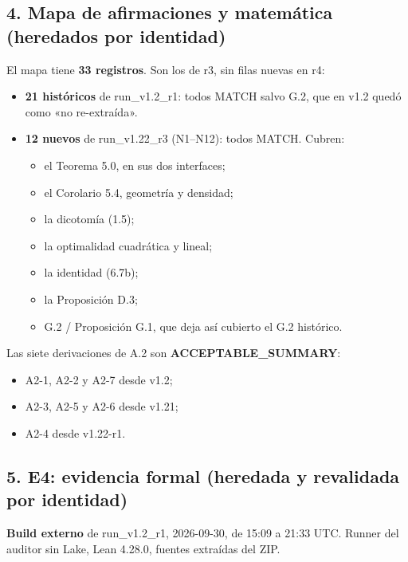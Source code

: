\documentclass[
]{article}
\providecommand{\tightlist}{%
  \setlength{\itemsep}{0pt}\setlength{\parskip}{0pt}}
\begin{document}
\subsection{4. Mapa de afirmaciones y matemática (heredados por
identidad)}\label{4-mapa-de-afirmaciones-y-matemuxe1tica-heredados-por-identidad}

El mapa tiene \textbf{33 registros}. Son los de r3, sin filas nuevas en
r4:

\begin{itemize}
\tightlist
\item
  \textbf{21 históricos} de run\_v1.2\_r1: todos MATCH salvo G.2, que en
  v1.2 quedó como «no re-extraída».
\item
  \textbf{12 nuevos} de run\_v1.22\_r3 (N1--N12): todos MATCH. Cubren:

  \begin{itemize}
  \tightlist
  \item
    el Teorema 5.0, en sus dos interfaces;
  \item
    el Corolario 5.4, geometría y densidad;
  \item
    la dicotomía (1.5);
  \item
    la optimalidad cuadrática y lineal;
  \item
    la identidad (6.7b);
  \item
    la Proposición D.3;
  \item
    G.2 / Proposición G.1, que deja así cubierto el G.2 histórico.
  \end{itemize}
\end{itemize}

Las siete derivaciones de A.2 son \textbf{ACCEPTABLE\_SUMMARY}:

\begin{itemize}
\tightlist
\item
  A2-1, A2-2 y A2-7 desde v1.2;
\item
  A2-3, A2-5 y A2-6 desde v1.21;
\item
  A2-4 desde v1.22-r1.
\end{itemize}

\subsection{5. E4: evidencia formal (heredada y revalidada por
identidad)}\label{5-e4-evidencia-formal-heredada-y-revalidada-por-identidad}

\textbf{Build externo} de run\_v1.2\_r1, 2026-09-30, de 15:09 a 21:33
UTC. Runner del auditor sin Lake, Lean 4.28.0, fuentes extraídas del
ZIP.
\end{document}
